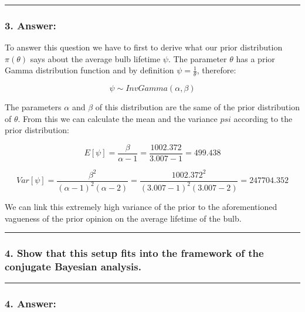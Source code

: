 \documentclass[
]{article}
\begin{document}
\begin{center}\rule{0.5\linewidth}{0.5pt}\end{center}

\hypertarget{answer-6}{%
\subsubsection{3. Answer:}\label{answer-6}}

To answer this question we have to first to derive what our prior
distribution \(\pi(\theta)\) says about the average bulb lifetime
\(\psi\). The parameter \(\theta\) has a prior Gamma distribution
function and by definition \(\psi = \frac{1}{\theta}\), therefore:

\[
\psi \sim InvGamma(\alpha, \beta)
\]

The parameters \(\alpha\) and \(\beta\) of this distribution are the
same of the prior distribution of \(\theta\). From this we can calculate
the mean and the variance \(psi\) according to the prior distribution:

\[
E[\psi] = \frac{\beta}{\alpha - 1} = \frac{1002.372}{3.007 - 1} = 499.438
\]

\[
Var[\psi] = \frac{\beta^2}{(\alpha - 1)^2(\alpha - 2)} = \frac{1002.372^2}{(3.007 - 1)^2(3.007 - 2)} = 247704.352
\]

We can link this extremely high variance of the prior to the
aforementioned vagueness of the prior opinion on the average lifetime of
the bulb.

\begin{center}\rule{0.5\linewidth}{0.5pt}\end{center}

\hypertarget{show-that-this-setup-fits-into-the-framework-of-the-conjugate-bayesian-analysis.}{%
\subsubsection{4. Show that this setup fits into the framework of the
conjugate Bayesian
analysis.}\label{show-that-this-setup-fits-into-the-framework-of-the-conjugate-bayesian-analysis.}}

\begin{center}\rule{0.5\linewidth}{0.5pt}\end{center}

\hypertarget{answer-7}{%
\subsubsection{4. Answer:}\label{answer-7}}
\end{document}
